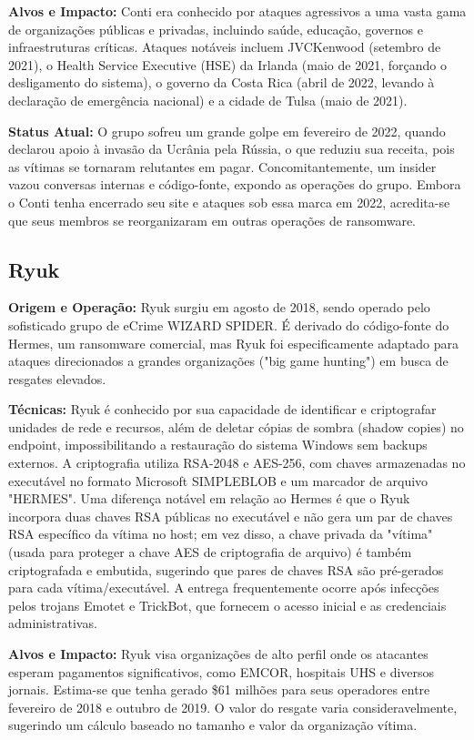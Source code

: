 \textbf{Alvos e Impacto:} Conti era conhecido por ataques agressivos a uma vasta gama de organizações públicas e privadas, incluindo saúde, educação, governos e infraestruturas críticas. Ataques notáveis incluem JVCKenwood (setembro de 2021), o Health Service Executive (HSE) da Irlanda (maio de 2021, forçando o desligamento do sistema), o governo da Costa Rica (abril de 2022, levando à declaração de emergência nacional) e a cidade de Tulsa (maio de 2021).

\textbf{Status Atual:} O grupo sofreu um grande golpe em fevereiro de 2022, quando declarou apoio à invasão da Ucrânia pela Rússia, o que reduziu sua receita, pois as vítimas se tornaram relutantes em pagar. Concomitantemente, um insider vazou conversas internas e código-fonte, expondo as operações do grupo. Embora o Conti tenha encerrado seu site e ataques sob essa marca em 2022, acredita-se que seus membros se reorganizaram em outras operações de ransomware.

\subsection{Ryuk}
\textbf{Origem e Operação:} Ryuk surgiu em agosto de 2018, sendo operado pelo sofisticado grupo de eCrime WIZARD SPIDER. É derivado do código-fonte do Hermes, um ransomware comercial, mas Ryuk foi especificamente adaptado para ataques direcionados a grandes organizações ("big game hunting") em busca de resgates elevados.

\textbf{Técnicas:} Ryuk é conhecido por sua capacidade de identificar e criptografar unidades de rede e recursos, além de deletar cópias de sombra (shadow copies) no endpoint, impossibilitando a restauração do sistema Windows sem backups externos. A criptografia utiliza RSA-2048 e AES-256, com chaves armazenadas no executável no formato Microsoft SIMPLEBLOB e um marcador de arquivo "HERMES". Uma diferença notável em relação ao Hermes é que o Ryuk incorpora duas chaves RSA públicas no executável e não gera um par de chaves RSA específico da vítima no host; em vez disso, a chave privada da "vítima" (usada para proteger a chave AES de criptografia de arquivo) é também criptografada e embutida, sugerindo que pares de chaves RSA são pré-gerados para cada vítima/executável. A entrega frequentemente ocorre após infecções pelos trojans Emotet e TrickBot, que fornecem o acesso inicial e as credenciais administrativas.

\textbf{Alvos e Impacto:} Ryuk visa organizações de alto perfil onde os atacantes esperam pagamentos significativos, como EMCOR, hospitais UHS e diversos jornais. Estima-se que tenha gerado \$61 milhões para seus operadores entre fevereiro de 2018 e outubro de 2019. O valor do resgate varia consideravelmente, sugerindo um cálculo baseado no tamanho e valor da organização vítima.

